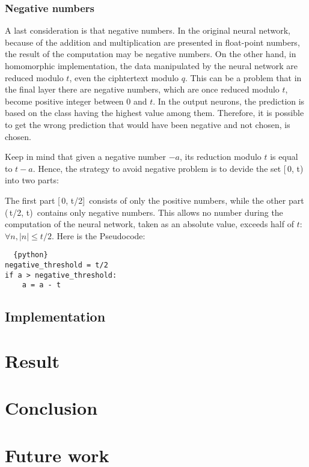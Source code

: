 \documentclass[A4paper,12pt]{article}
\begin{document}
	\subsubsection{Negative numbers}

A last consideration is that negative numbers. In the original neural network, because of the addition and multiplication are presented in float-point numbers, the result of the computation may be negative numbers. On the other hand, in homomorphic implementation, the data manipulated by the neural network are reduced modulo $t$, even the ciphtertext modulo $q$. This can be a problem that in the final layer there are negative numbers, which are once reduced modulo $t$, become positive integer between 0 and $t$. In the output neurons, the prediction is based on the class having the highest value among them. Therefore, it is possible to get the wrong prediction that would have been negative and not chosen, is chosen.

Keep in mind that given a negative number $-a$, its reduction modulo $t$ is equal to $t - a$. Hence, the strategy to avoid negative problem is to devide the set [\,0, t)\, into two parts: 

The first part [\,0, t/2]\, consists of only the positive numbers, while the other part (\,t/2, t)\, contains only negative numbers. This allows no number during the computation of the neural network, taken as an absolute value, exceeds half of $t$: $\forall n, |n| \leq t/2$. Here is the Pseudocode:\\
\begin{lstlisting}	{python}
negative_threshold = t/2
if a > negative_threshold:
	a = a - t
\end{lstlisting}


\subsection{Implementation}

\section{Result}

\section{Conclusion}

\section{Future work}
\end{document}
